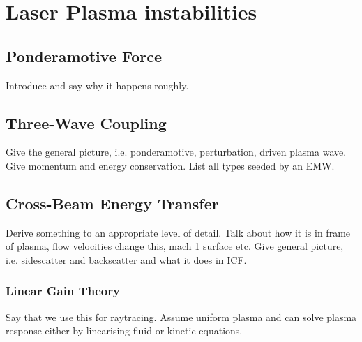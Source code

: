 \section{Laser Plasma instabilities}%
\label{sec:theory_LPIs}

\subsection{Ponderamotive Force}%
\label{sec:theory_ponderamotive}

Introduce and say why it happens roughly.

\subsection{Three-Wave Coupling}%
\label{sec:theory_threewave}

Give the general picture, i.e. ponderamotive, perturbation, driven plasma wave.
Give momentum and energy conservation.
List all types seeded by an EMW.

\subsection{Cross-Beam Energy Transfer}%
\label{sec:theory_CBET}

Derive something to an appropriate level of detail.
Talk about how it is in frame of plasma, flow velocities change this, mach 1 surface etc.
Give general picture, i.e. sidescatter and backscatter and what it does in ICF.


\subsubsection{Linear Gain Theory}%
\label{sec:theory_lineargaincbet}

Say that we use this for raytracing.
Assume uniform plasma and can solve plasma response either by linearising fluid or kinetic equations.

